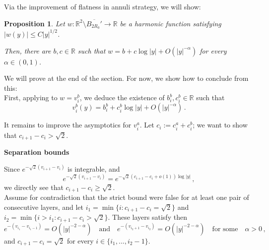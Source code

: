 \documentclass{article}
\newcommand{\R}{\mathbb{R}}
\newtheorem{proposition}[theorem]{Proposition}
\theoremstyle{definition}
\begin{document}
    Via the improvement of flatness in annuli strategy, we will show:
\begin{proposition}\label{prop:logexp3D}
    Let $w:\R^2\setminus \overline{B_{2 R_0}'}\to\R$ be a harmonic function satisfying $|w(y)|\leq C|y|^{1/2}$.
    
    Then, there are $b,c\in\R$ such that $w=b+c\log|y|+O(|y|^{-\alpha})$ for every $\alpha\in (0,1)$.
\end{proposition}
We will prove  at the end of the section. For now, we show how to conclude from this:\\


First, applying  to $w=v_i^b$, we deduce the existence of $b_i^b,c_i^b\in\R$ such that
\begin{equation}\label{eq:2543h02th20}
    v_i^b(y)=b_i^b+c_i^b\log|y|+O(|y|^{-\alpha})\,.
\end{equation}

It remains to improve the asymptotics for $v_i^a$. Let $c_i:=c_i^a+c_i^b$; we want to show that $c_{i+1}-c_i> \sqrt{2}$.


{\bf Separation bounds}

Since $e^{-\sqrt{2}(v_{i+1}-v_i)}$ is integrable, and
$$e^{-\sqrt{2}(v_{i+1}-v_i)}=e^{-\sqrt{2}(c_{i+1}-c_i+o(1))\log|y|}\,,$$
we directly see that $c_{i+1}-c_i\geq \sqrt{2}$.\\

Assume for contradiction that the strict bound were false for at least one pair of consecutive layers, and let $i_1=\min\{i:c_{i+1}-c_{i}=\sqrt{2}\}$ and $i_2=\min\{i>i_1:c_{i+1}-c_{i}>\sqrt{2}\}$. These layers satisfy then
\begin{equation}\label{eq:174ggqbpg}
    e^{-(v_{i_1}-v_{i_1-1})}=O(|y|^{-2-\alpha})\quad\mbox{and}\quad e^{-(v_{i_2+1}-v_{i_2})}=O(|y|^{-2-\alpha})\quad\mbox{for some}\quad \alpha>0\,,
\end{equation}
and $c_{i+1}-c_i=\sqrt{2}$ for every $i\in\{i_1,...,i_2-1\}$.\\
\end{document}

